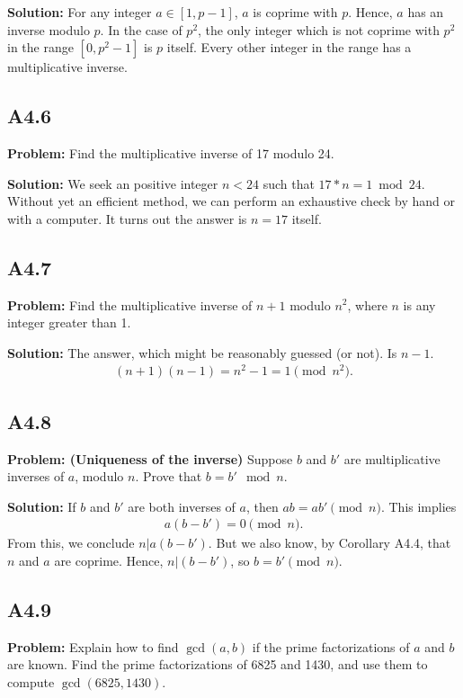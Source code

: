 \documentclass{article}
\begin{document}
\textbf{Solution:} For any integer $a\in [1,p-1]$, $a$ is coprime with $p$. Hence, $a$ has an inverse modulo $p$. In the case of $p^2$, the only integer which is not coprime with $p^2$ in the range $[0,p^2-1]$ is $p$ itself. Every other integer in the range has a multiplicative inverse. 

\subsection*{A4.6}
\textbf{Problem:} Find the multiplicative inverse of 17 modulo 24.

\textbf{Solution:} We seek an positive integer $n<24$ such that $17 * n = 1 \bmod 24$. Without yet an efficient method, we can perform an exhaustive check by hand or with a computer. It turns out the answer is $n=17$ itself. 

\subsection*{A4.7}
\textbf{Problem:} Find the multiplicative inverse of $n+1$ modulo $n^2$, where $n$ is any integer greater than 1.

\textbf{Solution:} The answer, which might be reasonably guessed (or not). Is $n-1$.
\begin{align}
    (n+1)(n-1) = n^2 - 1 = 1 \pmod n^2.
\end{align}

\subsection*{A4.8}
\textbf{Problem: (Uniqueness of the inverse)} Suppose $b$ and $b'$ are multiplicative inverses of $a$, modulo $n$. Prove that $b=b' \mod n$.

\textbf{Solution:} If $b$ and $b'$ are both inverses of $a$, then $ab = ab' \pmod n$. This implies
\begin{align}
    a(b-b') = 0 \pmod n.
\end{align}
From this, we conclude $n|a(b-b')$. But we also know, by Corollary A4.4, that $n$ and $a$ are coprime. Hence, $n|(b-b')$, so $b=b' \pmod{n}$.

\subsection*{A4.9}
\textbf{Problem:} Explain how to find $\gcd(a,b)$ if the prime factorizations of $a$ and $b$ are known. Find the prime factorizations of 6825 and 1430, and use them to compute $\gcd(6825,1430)$.
\end{document}
